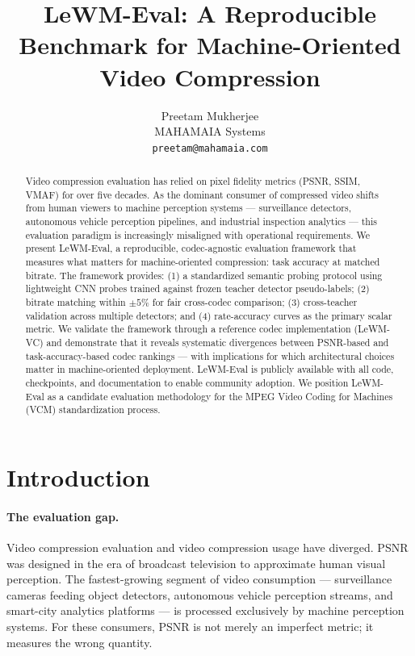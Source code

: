 \documentclass{article}
\title{LeWM-Eval: A Reproducible Benchmark for Machine-Oriented\\Video Compression}
\author{
  Preetam Mukherjee \\
  MAHAMAIA Systems \\
  \texttt{preetam@mahamaia.com}
}
\begin{document}
\maketitle

\begin{abstract}
Video compression evaluation has relied on pixel fidelity metrics (PSNR, SSIM, VMAF) for over five decades. As the dominant consumer of compressed video shifts from human viewers to machine perception systems --- surveillance detectors, autonomous vehicle perception pipelines, and industrial inspection analytics --- this evaluation paradigm is increasingly misaligned with operational requirements. We present LeWM-Eval, a reproducible, codec-agnostic evaluation framework that measures what matters for machine-oriented compression: task accuracy at matched bitrate. The framework provides: (1) a standardized semantic probing protocol using lightweight CNN probes trained against frozen teacher detector pseudo-labels; (2) bitrate matching within $\pm 5\%$ for fair cross-codec comparison; (3) cross-teacher validation across multiple detectors; and (4) rate-accuracy curves as the primary scalar metric. We validate the framework through a reference codec implementation (LeWM-VC) and demonstrate that it reveals systematic divergences between PSNR-based and task-accuracy-based codec rankings --- with implications for which architectural choices matter in machine-oriented deployment. LeWM-Eval is publicly available with all code, checkpoints, and documentation to enable community adoption. We position LeWM-Eval as a candidate evaluation methodology for the MPEG Video Coding for Machines (VCM) standardization process.
\end{abstract}

\section{Introduction}
\label{sec:intro}

\paragraph{The evaluation gap.}
Video compression evaluation and video compression usage have diverged. PSNR was designed in the era of broadcast television to approximate human visual perception. The fastest-growing segment of video consumption --- surveillance cameras feeding object detectors, autonomous vehicle perception streams, and smart-city analytics platforms --- is processed exclusively by machine perception systems. For these consumers, PSNR is not merely an imperfect metric; it measures the wrong quantity.
\end{document}
